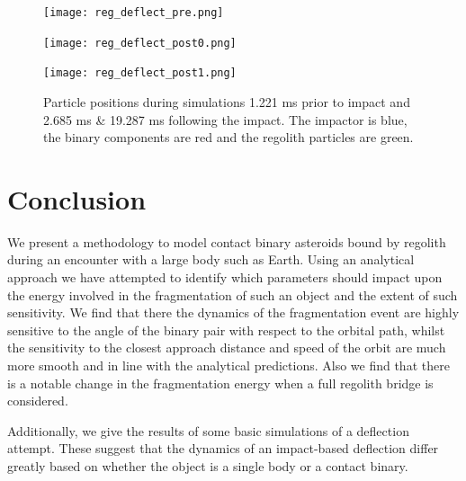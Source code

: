 \documentclass[letterpaper, preprint, paper,11pt]{AAS}	%
\begin{document}
\begin{figure}[H]
\centering
\centerline{\texttt{[image: reg\_deflect\_pre.png]}}
\centerline{\texttt{[image: reg\_deflect\_post0.png]}} 
\centerline{\texttt{[image: reg\_deflect\_post1.png]}} 
\caption{Particle positions during simulations 1.221 ms prior to impact and 2.685 ms  \& 19.287 ms following the impact. The impactor is blue, the binary components are red and the regolith particles are green.} 
\label{fig:boom}
\end{figure} 

\section{Conclusion}
We present a methodology to model contact binary asteroids bound by regolith during an encounter with a large body such as Earth. Using an analytical approach we have attempted to identify which parameters should impact upon the energy involved in the fragmentation of such an object and the extent of such sensitivity. We find that there the dynamics of the fragmentation event are highly sensitive to the angle of the binary pair with respect to the orbital path, whilst the sensitivity to the closest approach distance and speed of the orbit are much more smooth and in line with the analytical predictions. Also we find that there is a notable change in the fragmentation energy when a full regolith bridge is considered.

Additionally, we give the results of some basic simulations of a deflection attempt. These suggest that the dynamics of an impact-based deflection differ greatly based on whether the object is a single body or a contact binary. 


\end{document}
